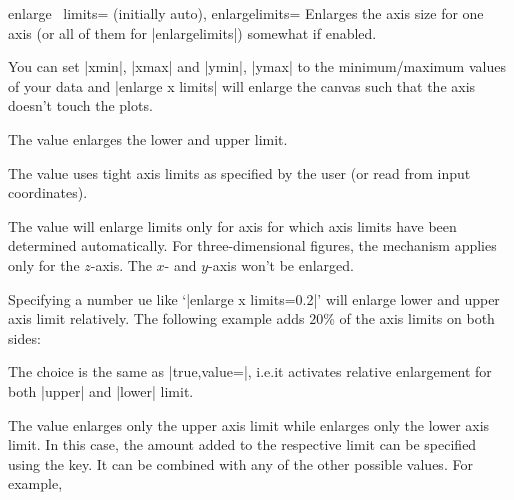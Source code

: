\begin{pgfplotsxykeylist}{%
    enlarge \x\ limits= (initially auto),
    enlargelimits=%
}
    Enlarges the axis size for one axis (or all of them for |enlargelimits|)
    somewhat if enabled.

    You can set |xmin|, |xmax| and |ymin|, |ymax| to the minimum/maximum values
    of your data and |enlarge x limits| will enlarge the canvas such that the
    axis doesn't touch the plots.

    The value  enlarges the lower and upper limit.

    The value  uses tight axis limits as specified by the
    user (or read from input coordinates).

    The value  will enlarge limits only for axis for which
    axis limits have been determined automatically. For three-dimensional
    figures, the  mechanism applies only for the $z$-axis.
    The $x$- and $y$-axis won't be enlarged.
\begin{codeexample}[]
\end{codeexample}

     Specifying a number ue like `|enlarge x limits=0.2|' will
     enlarge lower and upper axis limit relatively. The following example adds
     $20\%$ of the axis limits on both sides:
\begin{codeexample}[]
\end{codeexample}
    \noindent The choice  is the same as
    |true,value=|, i.e.\@ it activates relative enlargement for
    both |upper| and |lower| limit.

    The value  enlarges only the upper axis limit while
     enlarges only the lower axis limit. In this case, the
    amount added to the respective limit can be specified using the
     key. It can be combined with any of the
    other possible values. For example,


\end{pgfplotsxykeylist}
